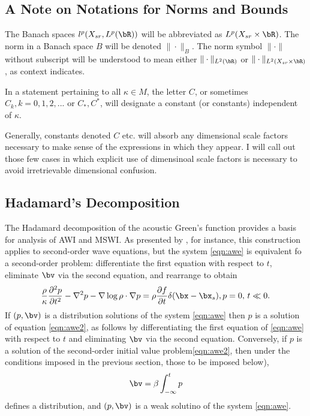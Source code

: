 \subsection{A Note on Notations  for Norms and Bounds}
The Banach spaces
$l^p(X_{sr},L^p(\bR))$ will be abbreviated as $L^p(X_{sr} \times
\bR)$. The norm in a Banach space $B$ will be denoted
$\|\cdot\|_{B}$. The norm symbol
$\|\cdot\|$ without subscript will be understood to mean either
$\|\cdot\|_{L^2(\bR)}$ or $\|\cdot\|_{L^2(X_{sr}\times
  \bR)}$, as context indicates.

In a statement pertaining to all
$\kappa \in M$, the letter $C$, or sometimes $C_k,
k=0,1,2,...$ or
$C_*,C^*$, will designate a constant (or constants) independent of
$\kappa$.

Generally, constants denoted $C$ etc. will absorb any dimensional
scale factors necessary to make sense of the expressions in which they
appear. I will call out those few cases in which explicit use of
dimensinoal scale factors is necessary to avoid irretrievable
dimensional confusion.

\subsection{Hadamard's Decomposition}
The Hadamard decomposition of the acoustic Green's function \cite[]{Friedlander:75,Qian:JCP24} provides a
basis for analysis of AWI and MSWI. As presented by
\cite{Friedlander:75}, for instance, this construction applies to
second-order wave equations, but the system \ref{eqn:awe} is
equivalent fo a second-order problem: differentiate the first equation
with respect to $t$, eliminate $\bv$ via the second equation, and
rearrange to obtain
\begin{equation}
  \label{eqn:awe2}
  \frac{\rho}{\kappa}\frac{\partial^2 p}{\partial t^2} - \nabla^2 p -
  \nabla \log \rho \cdot \nabla p = \rho \frac{\partial f}{\partial t}
  \delta(\bx-\bx_s), \nonumber \\
  p=0, \, t \ll 0.
\end{equation}
If $(p,\bv)$ is a distribution solutions of the system
\ref{eqn:awe} then $p$ is a solution of equation
\ref{eqn:awe2}, as follows by differentiating the first equation of
\ref{eqn:awe} with respect to $t$ and eliminating $\bv$ via the second
equation. Conversely, if $p$ is a solution of the second-order initial
value problem\ref{eqn:awe2}, then under the conditions imposed in the
previous section, those to be imposed below),
\[
  \bv = \beta \int_{-\infty}^t p
\]
defines a distribution, and $(p,\bv)$ is a weak solutino of the system \ref{eqn:awe}.

